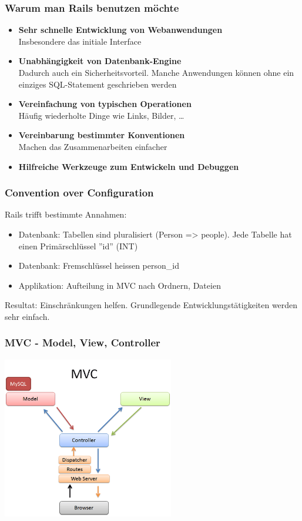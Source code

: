 \begin{frame}
  \frametitle{Warum man Rails benutzen möchte}
  \begin{itemize}
    \pause
    \item{{\bf Sehr schnelle Entwicklung von Webanwendungen} \\ Insbesondere das initiale Interface}
    \pause
    \item{{\bf Unabhängigkeit von Datenbank-Engine} \\ Dadurch auch ein Sicherheitsvorteil. Manche Anwendungen können ohne ein einziges SQL-Statement geschrieben werden}
    \pause
    \item{{\bf Vereinfachung von typischen Operationen} \\ Häufig wiederholte Dinge wie Links, Bilder, \ldots}
    \pause
    \item{{\bf Vereinbarung bestimmter Konventionen} \\ Machen das Zusammenarbeiten einfacher}
    \pause
    \item{{\bf Hilfreiche Werkzeuge zum Entwickeln und Debuggen}}
  \end{itemize}
\end{frame}

\begin{frame}
  \frametitle{Convention over Configuration}
  Rails trifft bestimmte Annahmen:
  \vspace{0.5cm}
  \begin{itemize}
    \pause
    \item Datenbank: Tabellen sind pluralisiert (Person => people). Jede Tabelle hat einen Primärschlüssel ''id'' (INT)
    \pause
    \item Datenbank: Fremschlüssel heissen person\_id
    \pause
    \item Applikation: Aufteilung in MVC nach Ordnern, Dateien
  \end{itemize}
  \vspace{0.5cm}
  Resultat: Einschränkungen helfen. Grundlegende Entwicklungstätigkeiten werden sehr einfach.
\end{frame}

\begin{frame}
  \frametitle{MVC - Model, View, Controller}
  \begin{center}
    \includegraphics[width=7.5cm]{img/mvc.png}
  \end{center}
\end{frame}


